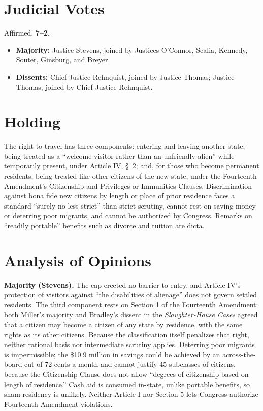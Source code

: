 \documentclass[12pt]{article}
\begin{document}
\section{Judicial Votes}

Affirmed, \textbf{7--2}.
\begin{itemize}
\item \textbf{Majority:} Justice Stevens, joined by Justices O'Connor, Scalia, Kennedy, Souter, Ginsburg, and Breyer.
\item \textbf{Dissents:} Chief Justice Rehnquist, joined by Justice Thomas; Justice Thomas, joined by Chief Justice Rehnquist.
\end{itemize}

\section{Holding}

The right to travel has three components: entering and leaving another state; being treated as a ``welcome visitor rather than an unfriendly alien'' while temporarily present, under Article IV, \S~2; and, for those who become permanent residents, being treated like other citizens of the new state, under the Fourteenth Amendment's Citizenship and Privileges or Immunities Clauses. Discrimination against bona fide new citizens by length or place of prior residence faces a standard ``surely no less strict'' than strict scrutiny, cannot rest on saving money or deterring poor migrants, and cannot be authorized by Congress. Remarks on ``readily portable'' benefits such as divorce and tuition are dicta.

\section{Analysis of Opinions}

\textbf{Majority (Stevens).} The cap erected no barrier to entry, and Article IV's protection of visitors against ``the disabilities of alienage'' does not govern settled residents. The third component rests on Section 1 of the Fourteenth Amendment: both Miller's majority and Bradley's dissent in the \textit{Slaughter-House Cases} agreed that a citizen may become a citizen of any state by residence, with the same rights as its other citizens. Because the classification itself penalizes that right, neither rational basis nor intermediate scrutiny applies. Deterring poor migrants is impermissible; the \$10.9 million in savings could be achieved by an across-the-board cut of 72 cents a month and cannot justify 45 subclasses of citizens, because the Citizenship Clause does not allow ``degrees of citizenship based on length of residence.'' Cash aid is consumed in-state, unlike portable benefits, so sham residency is unlikely. Neither Article I nor Section 5 lets Congress authorize Fourteenth Amendment violations.
\end{document}
